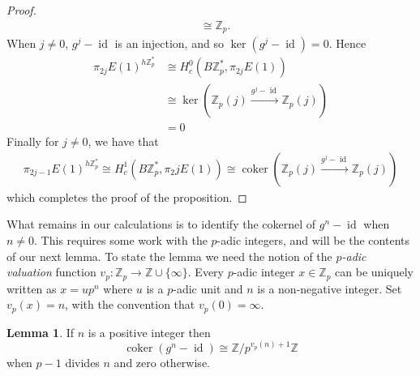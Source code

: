 \documentclass[a4paper]{article} %
\theoremstyle{definition}
\newtheorem{lemma}[theorem]{Lemma}
\newcommand{\toWithMapLong}[1]{\overset{#1}{\longrightarrow}}
\newcommand{\Z}{\mathbb{Z}}
\DeclareMathOperator{\id}{id}           %
\DeclareMathOperator{\coker}{coker}     %
\begin{document}
\begin{proof}
\begin{align*}
    & \cong \Z_p.
\end{align*}
When $j \neq 0$, $g^j - \id$ is an injection, and so $\ker(g^j - \id) = 0$. Hence
\begin{align*}
  \pi_{2j} E(1)^{h\Z_p^*} & \cong  H^0_c(B\Z_p^*, \pi_{2j} E(1)) \\
    & \cong \ker (\Z_p(j) \toWithMapLong{g^j - \id} \Z_p(j)) \\
    &  = 0
\end{align*}
Finally for $j \neq 0$, we have that
\begin{align*}
  \pi_{2j-1} E(1)^{h\Z_p^*}  \cong  H^1_c(B\Z_p^*, \pi_2j E(1))
    \cong \coker (\Z_p(j) \toWithMapLong{g^j - \id} \Z_p(j))
\end{align*}
which completes the proof of the proposition.
\end{proof}
What remains in our calculations is to identify the cokernel of $g^n-\id$ when $n \neq 0$. This requires some work with the $p$-adic integers, and will be the contents of our next lemma. To state the lemma we need the notion of the \textit{$p$-adic valuation} function $v_p \colon \Z_p \to \Z \cup \{\infty\}$. Every $p$-adic integer $x \in \Z_p$ can be uniquely written as $x = up^n$ where $u$ is a $p$-adic unit and $n$ is a non-negative integer. Set $v_p(x) = n$, with the convention that $v_p(0) = \infty$.
\begin{lemma}
  If $n$ is a positive integer then
  \[
    \coker(g^n - \id) \cong \Z/p^{v_p(n)+1}\Z
  \]
  when $p-1$ divides $n$ and zero otherwise.
\end{lemma}
\end{document}
